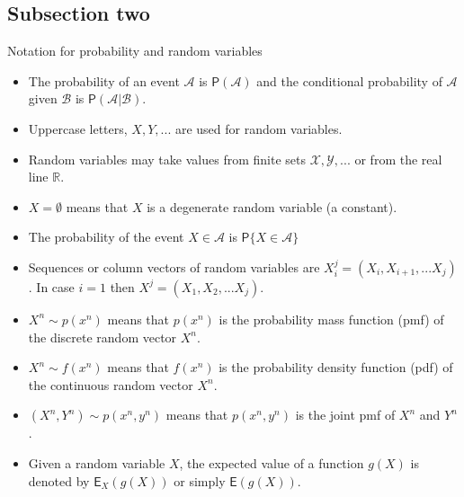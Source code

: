 \documentclass[]{beamer}
\begin{document}
\subsection{Subsection two}
\begin{frame}[allowframebreaks]{Notation for probability and random variables}
\vspace{0pt}
\begin{itemize}
\item The probability of an event $\mathcal A$ is $\mathsf P(\mathcal A)$ and the conditional probability of $\mathcal A$ given $\mathcal B$ is $\mathsf P(\mathcal A|\mathcal B)$.
\item Uppercase letters, $X,Y,...$ are used for random variables.
\item Random variables may take values from finite sets $\mathcal{X,Y, ...}$ or from the real line $\mathbb R$.
\item $X=\emptyset$ means that $X$ is a degenerate random variable (a constant).
\item The probability of the event $X\in \mathcal A$ is $\mathsf P\{X\in \mathcal A\}$
\item Sequences or column vectors of random variables are $X_i^j=(X_i, X_{i+1}, ...X_j)$. In case $i=1$ then $X^j=(X_1, X_2, ...X_j)$.
\end{itemize}
%
%
%
\framebreak
%
%
\begin{itemize}
\item $X^n \sim p(x^n)$ means that $p(x^n)$ is the probability mass function (pmf) of the discrete random vector $X^n$.
\item $X^n \sim f(x^n)$ means that $f(x^n)$ is the probability density function (pdf) of the continuous random vector $X^n$.
\item $(X^n, Y^n)\sim p(x^n,y^n)$ means that $p(x^n,y^n)$ is the joint pmf of $X^n$ and $Y^n$.
\item Given a random variable $X$, the expected value of a function $g(X)$ is denoted by $\mathsf E_X(g(X))$ or simply $\mathsf E(g(X))$.

\end{itemize}
\end{frame}
\end{document}
